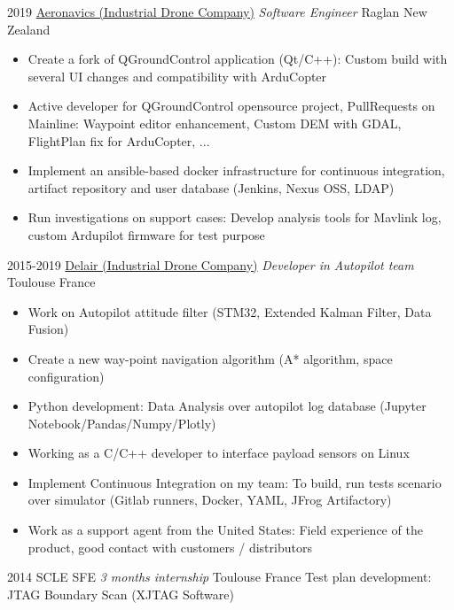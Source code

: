 \documentclass[a4paper]{friggeri-cv} %
\begin{document}
\begin{entrylist}
\entry
{2019}
{\href{https://aeronavics.com}{Aeronavics (Industrial Drone Company)} \textit{ Software Engineer}}
{Raglan New Zealand}
{
\begin{itemize}
    \item Create a fork of QGroundControl application (Qt/C++): Custom build with several UI changes and compatibility with ArduCopter
    \item Active developer for QGroundControl opensource project, PullRequests on Mainline: Waypoint editor enhancement, Custom DEM with GDAL, FlightPlan fix for ArduCopter, ...  
    \item Implement an ansible-based docker infrastructure for continuous integration, artifact repository and user database (Jenkins, Nexus OSS, LDAP)
    \item Run investigations on support cases: Develop analysis tools for Mavlink log, custom Ardupilot firmware for test purpose
\end{itemize}
%
}
\entry
{2015-2019}
{\href{https://delair.aero}{Delair (Industrial Drone Company)} \textit{ Developer in Autopilot team}}
{Toulouse France}
{
\begin{itemize}
\item Work on Autopilot attitude filter (STM32, Extended Kalman Filter, Data Fusion)
\item Create a new way-point navigation algorithm (A* algorithm, space configuration)
\item Python development: Data Analysis over autopilot log database (Jupyter Notebook/Pandas/Numpy/Plotly)%
\item Working as a C/C++ developer to interface payload sensors on Linux%
\item Implement Continuous Integration on my team: To build, run tests scenario over simulator (Gitlab runners, Docker, YAML, JFrog Artifactory) 
\item Work as a support agent from the United States: Field experience of the
	product, good contact with customers / distributors
\end{itemize}
%
}
\entry
{2014}
{SCLE SFE \textit{3 months internship}}
{Toulouse France}
{Test plan development: JTAG Boundary Scan (XJTAG Software)
}


\end{entrylist}
\end{document}
